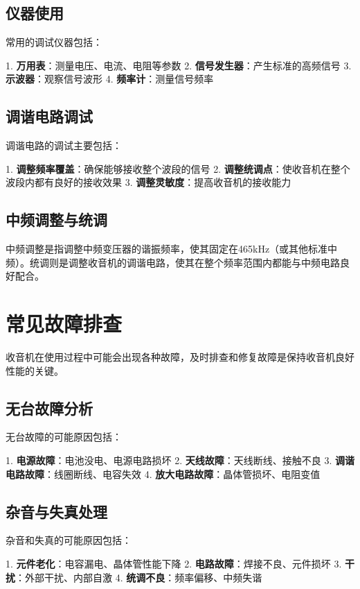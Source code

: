 \documentclass[12pt,UTF8]{ctexbook}
\begin{document}
\section{仪器使用}

常用的调试仪器包括：

1. \textbf{万用表}：测量电压、电流、电阻等参数
2. \textbf{信号发生器}：产生标准的高频信号
3. \textbf{示波器}：观察信号波形
4. \textbf{频率计}：测量信号频率

\section{调谐电路调试}

调谐电路的调试主要包括：

1. \textbf{调整频率覆盖}：确保能够接收整个波段的信号
2. \textbf{调整统调点}：使收音机在整个波段内都有良好的接收效果
3. \textbf{调整灵敏度}：提高收音机的接收能力

\section{中频调整与统调}

中频调整是指调整中频变压器的谐振频率，使其固定在465kHz（或其他标准中频）。统调则是调整收音机的调谐电路，使其在整个频率范围内都能与中频电路良好配合。

\chapter{常见故障排查}

收音机在使用过程中可能会出现各种故障，及时排查和修复故障是保持收音机良好性能的关键。

\section{无台故障分析}

无台故障的可能原因包括：

1. \textbf{电源故障}：电池没电、电源电路损坏
2. \textbf{天线故障}：天线断线、接触不良
3. \textbf{调谐电路故障}：线圈断线、电容失效
4. \textbf{放大电路故障}：晶体管损坏、电阻变值

\section{杂音与失真处理}

杂音和失真的可能原因包括：

1. \textbf{元件老化}：电容漏电、晶体管性能下降
2. \textbf{电路故障}：焊接不良、元件损坏
3. \textbf{干扰}：外部干扰、内部自激
4. \textbf{统调不良}：频率偏移、中频失谐
\end{document}
